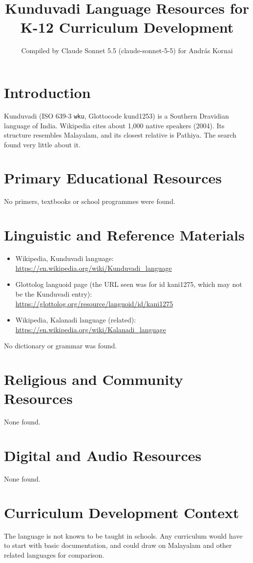 \documentclass[12pt]{article}
\title{Kunduvadi Language Resources for K-12 Curriculum Development}
\author{Compiled by Claude Sonnet 5.5 (claude-sonnet-5-5) for Andr\'as Kornai}
\date{}
\begin{document}
\maketitle

\section{Introduction}
Kunduvadi (ISO 639-3 \texttt{wku}, Glottocode kund1253) is a Southern Dravidian language of India. Wikipedia cites about 1,000 native speakers (2004). Its structure resembles Malayalam, and its closest relative is Pathiya. The search found very little about it.

\section{Primary Educational Resources}
No primers, textbooks or school programmes were found.

\section{Linguistic and Reference Materials}
\begin{itemize}
\item Wikipedia, Kunduvadi language: \url{https://en.wikipedia.org/wiki/Kunduvadi_language}
\item Glottolog languoid page (the URL seen was for id kani1275, which may not be the Kunduvadi entry): \url{https://glottolog.org/resource/languoid/id/kani1275}
\item Wikipedia, Kalanadi language (related): \url{https://en.wikipedia.org/wiki/Kalanadi_language}
\end{itemize}
No dictionary or grammar was found.

\section{Religious and Community Resources}
None found.

\section{Digital and Audio Resources}
None found.

\section{Curriculum Development Context}
The language is not known to be taught in schools. Any curriculum would have to start with basic documentation, and could draw on Malayalam and other related languages for comparison.
\end{document}
